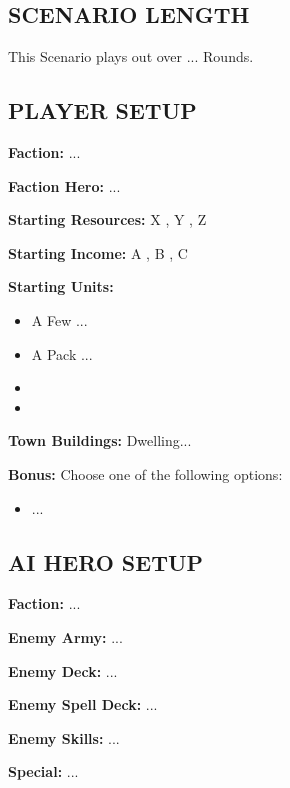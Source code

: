 
\begin{multicols*}{2}

\subsection*{\MakeUppercase{Scenario Length}}

This Scenario plays out over ... Rounds.

\subsection*{\MakeUppercase{Player Setup}}

\textbf{Faction:} ...

\textbf{Faction Hero:} ...

\textbf{Starting Resources:} X , Y , Z 

\textbf{Starting Income:} A , B , C 

\textbf{Starting Units:}
\begin{itemize}
  \item A Few ...
  \item A Pack ...
  \item {}
  \item {}
\end{itemize}

\textbf{Town Buildings:}  Dwelling...

\textbf{Bonus:} Choose one of the following options:
\begin{itemize}
    \item ...
\end{itemize}

\subsection*{\MakeUppercase{AI Hero Setup}}

\textbf{Faction:} ...

\textbf{Enemy Army:} ...

\textbf{Enemy Deck:} ...

\textbf{Enemy Spell Deck:} ...

\textbf{Enemy Skills:} ...

\textbf{Special:} ...


\end{multicols*}

